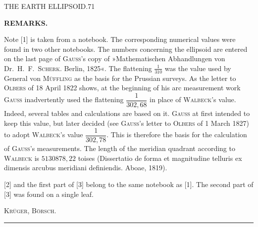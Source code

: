 \clearpage
\noindent\mbox{}\hfill THE EARTH ELLIPSOID.\hfill 71\par
\vspace{12mm}
\begin{center}\textbf{REMARKS.}\end{center}
{\small
Note [1] is taken from a notebook. The corresponding numerical values were found in two other
notebooks. The numbers concerning the ellipsoid are entered on the last page of \textsc{Gauss}'s
copy of »Mathematischen Abhandlungen von Dr.\ H.\ F.\ \textsc{Scherk}. Berlin, 1825«. The flattening
$\tfrac1{310}$ was the value used by General von \textsc{Müffling} as the basis for the Prussian
surveys. As the letter to \textsc{Olbers} of 18 April 1822 shows, at the beginning of his arc
measurement work \textsc{Gauss} inadvertently used the flattening $\dfrac1{302{,}68}$ in place of
\textsc{Walbeck}'s value. Indeed, several tables and calculations are based on it. \textsc{Gauss}
at first intended to keep this value, but later decided (see \textsc{Gauss}'s letter to
\textsc{Olbers} of 1 March 1827) to adopt \textsc{Walbeck}'s value $\dfrac1{302{,}78}$. This is
therefore the basis for the calculation of \textsc{Gauss}'s measurements. The length of the meridian
quadrant according to \textsc{Walbeck} is $5130878{,}22$ toises (Dissertatio de forma et magnitudine
telluris ex dimensis arcubus meridiani definiendis. Aboae, 1819).

[2] and the first part of [3] belong to the same notebook as [1]. The second part of [3]
was found on a single leaf.
\par\hfill\textsc{Krüger, Börsch.}\par
}
\begin{center}\rule{.25\textwidth}{.4pt}\end{center}
